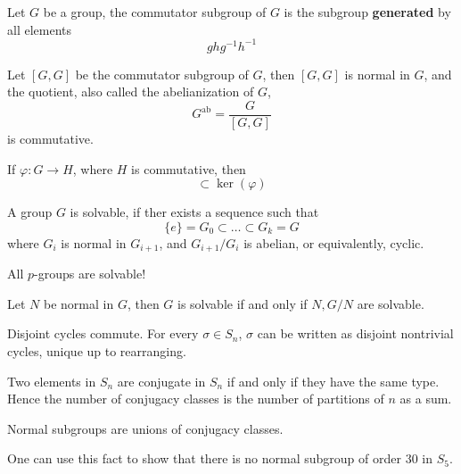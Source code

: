 \documentclass[openany]{book}
\begin{document}
\begin{defn}
    Let $G$ be a group, the commutator subgroup of $G$ is the subgroup \textbf{generated} by all elements 
    \begin{equation*}
        ghg^{-1}h^{-1}
    \end{equation*}
\end{defn}


\begin{prop}
    Let $[G,G]$ be the commutator subgroup of $G$, then $[G,G]$ is normal in $G$, and the quotient, also called the abelianization of $G$, 
    \begin{equation*}
        G^{\text{ab}}=\frac{G}{[G,G]}
    \end{equation*}
    is commutative.

    If $\varphi: G\to H$, where $H$ is commutative, then 
    \begin{equation*}
        [G,G]\subset\ker(\varphi)
    \end{equation*}
\end{prop}
\begin{defn}
    A group $G$ is solvable, if ther exists a sequence such that 
    \begin{equation*}
        \{e\}=G_0\subset\dots\subset G_k=G
    \end{equation*}
    where $G_i$ is normal in $G_{i+1}$, and $G_{i+1}/G_i$ is abelian, or equivalently, cyclic.
\end{defn}


\begin{prop}
    All $p$-groups are solvable!
\end{prop}

\begin{prop}
    Let $N$ be normal in $G$, then $G$ is solvable if and only if $N, G/N$ are solvable.
\end{prop}

\begin{prop}
    Disjoint cycles commute. For every $\sigma\in S_n$, $\sigma$ can be written as disjoint nontrivial cycles, unique up to rearranging.
\end{prop}

\begin{prop}
    Two elements in $S_n$ are conjugate in $S_n$ if and only if they have the same type. Hence the number of conjugacy classes is the number of partitions of $n$ as a sum.
\end{prop}

\begin{prop}
    Normal subgroups are unions of conjugacy classes. 

    One can use this fact to show that there is no normal subgroup of order 30 in $S_5$. 
\end{prop}
\end{document}
